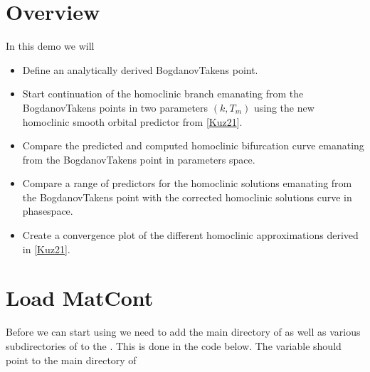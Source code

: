 \documentclass[letterpaper,10pt,english]{jupyterBook}
\begin{document}
\section{Overview}
\label{\detokenize{IFOC:overview}}
\sphinxAtStartPar
In this demo we will
\begin{itemize}
\item {} 
\sphinxAtStartPar
Define an analytically derived Bogdanov\sphinxhyphen{}Takens point.

\item {} 
\sphinxAtStartPar
Start continuation of the homoclinic branch emanating from the
Bogdanov\sphinxhyphen{}Takens points in two parameters \((k,T_m)\) using the new homoclinic
smooth orbital predictor from {[}\hyperlink{cite.references:id3}{Kuz21}{]}.

\item {} 
\sphinxAtStartPar
Compare the predicted and computed homoclinic bifurcation curve emanating from the
Bogdanov\sphinxhyphen{}Takens point in parameters space.

\item {} 
\sphinxAtStartPar
Compare a range of predictors for the homoclinic solutions emanating from the
Bogdanov\sphinxhyphen{}Takens point with the corrected homoclinic solutions curve in
phase\sphinxhyphen{}space.

\item {} 
\sphinxAtStartPar
Create a convergence plot of the different homoclinic approximations
derived in {[}\hyperlink{cite.references:id3}{Kuz21}{]}.

\end{itemize}


\section{Load MatCont}
\label{\detokenize{IFOC:load-matcont}}
\sphinxAtStartPar
Before we can start using  we need to add the main directory of
 as well as various subdirectories of  to the . This is done in the code below. The variable 
should point to the main directory of 
\end{document}
